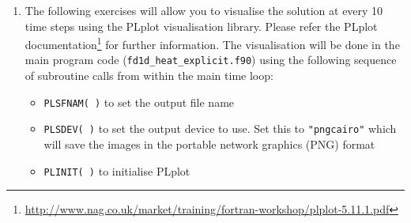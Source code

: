 \documentclass[12pt]{article}
\begin{document}
\begin{enumerate}
\begin{enumerate}
\item To include NetCDF Fortran bindings for compilation, add the flag in your Makefile:
\begin{verbatim}
-I/usr/local/netcdf-4.6.1/include
\end{verbatim}
\item To do the final link, add the link flag: 
\begin{verbatim}
-L/usr/local/netcdf-4.6.1/lib -lnetcdff -lnetcdf
\end{verbatim}
Note that the ordering of the flags is crucial (\texttt{netcdff} calls \texttt{netcdf} so this ordering is required).
The library \texttt{netcdff} contains the Fortran bindings and \texttt{netcdf} is the actual implementation in the
C language
\item After executing your code, you can view the contents of the NetCDF file using:
\begin{Verbatim} [commandchars=\\\{\}]
ncdump h\_test01.nc | less \textit{# or the command}
ncks h\_test01.nc | less \textit{# this gives much more information}
\end{Verbatim}
\item To verify whether your code works correctly, compare the created NetCDF file with the correct NetCDF file:
\begin{verbatim}
ncdiff --overwrite h_test01.nc h_test01.nc.valid -o diff.nc
ncwa -y max --overwrite diff.nc out.nc
ncdump out.nc | grep "solution ="
\end{verbatim}
The last command should show \texttt{0} for the \texttt{solution} NetCDF variable
\end{enumerate}
\item The following exercises will allow you to visualise the solution at every 10 time steps using the PLplot
visualisation library. Please refer the PLplot
documentation\footnote{\url{http://www.nag.co.uk/market/training/fortran-workshop/plplot-5.11.1.pdf}} for
further information. The visualisation will be done in the main program code (\texttt{fd1d\_heat\_explicit.f90}) using the
following sequence of subroutine calls from within the main time loop:
\begin{itemize}
\item\texttt{PLSFNAM( )} to set the output file name 
\item\texttt{PLSDEV( )} to set the output device to use. Set this to \texttt{"pngcairo"} which
will save the images in the portable network graphics (PNG) format
\item\texttt{PLINIT( )} to initialise PLplot

\end{itemize}
\end{enumerate}
\end{document}
